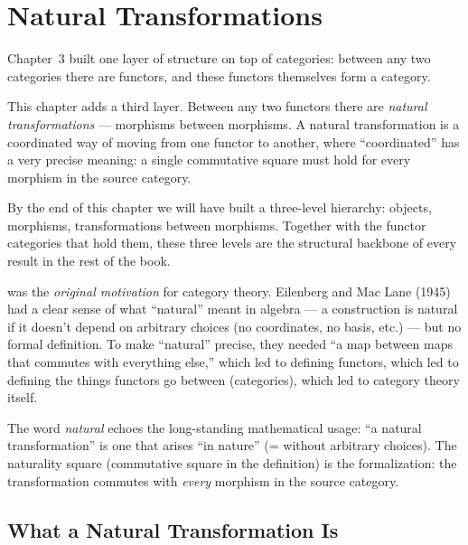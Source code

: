 \chapter{Natural Transformations}

\begin{overviewbox}
Chapter~3 built one layer of structure on top of categories: between any two
categories there are functors, and these functors themselves form a category.

This chapter adds a third layer. Between any two functors there are
\emph{natural transformations} --- morphisms between morphisms. A natural
transformation is a coordinated way of moving from one functor to another,
where ``coordinated'' has a very precise meaning: a single commutative square
must hold for every morphism in the source category.

By the end of this chapter we will have built a three-level hierarchy:
objects, morphisms, transformations between morphisms. Together with the
functor categories that hold them, these three levels are the structural
backbone of every result in the rest of the book.
\end{overviewbox}


\begin{nameorigin}
 was the \emph{original motivation} for
category theory. Eilenberg and Mac Lane (1945) had a clear sense of
what ``natural'' meant in algebra — a construction is natural if it
doesn't depend on arbitrary choices (no coordinates, no basis, etc.) —
but no formal definition. To make ``natural'' precise, they needed
``a map between maps that commutes with everything else,'' which led
to defining functors, which led to defining the things functors go
between (categories), which led to category theory itself.

The word \emph{natural} echoes the long-standing mathematical usage:
``a natural transformation'' is one that arises ``in nature'' (= without
arbitrary choices). The naturality square (commutative square in the
definition) is the formalization: the transformation commutes with
\emph{every} morphism in the source category.
\end{nameorigin}

\section{What a Natural Transformation Is}
\label{sec:nat-trans}

